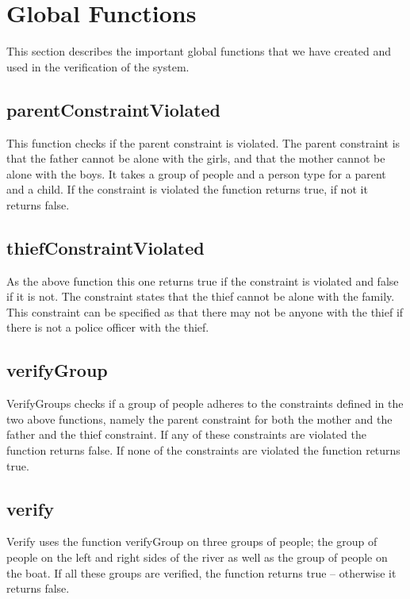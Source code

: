 \section{Global Functions}
This section describes the important global functions that we have created and used in the verification of the system.

\subsection{parentConstraintViolated}
This function checks if the parent constraint is violated. 
The parent constraint is that the father cannot be alone with the girls, and that the mother cannot be alone with the boys.
It takes a group of people and a person type for a parent and a child.
If the constraint is violated the function returns true, if not it returns false.

\subsection{thiefConstraintViolated}
As the above function this one returns true if the constraint is violated and false if it is not.
The constraint states that the thief cannot be alone with the family.
This constraint can be specified as that there may not be anyone with the thief if there is not a police officer with the thief.

\subsection{verifyGroup}
VerifyGroups checks if a group of people adheres to the constraints defined in the two above functions, namely the parent constraint for both the mother and the father and the thief constraint.
If any of these constraints are violated the function returns false.
If none of the constraints are violated the function returns true.

\subsection{verify}
Verify uses the function verifyGroup on three groups of people; the group of people on the left and right sides of the river as well as the group of people on the boat.
If all these groups are verified, the function returns true -- otherwise it returns false.